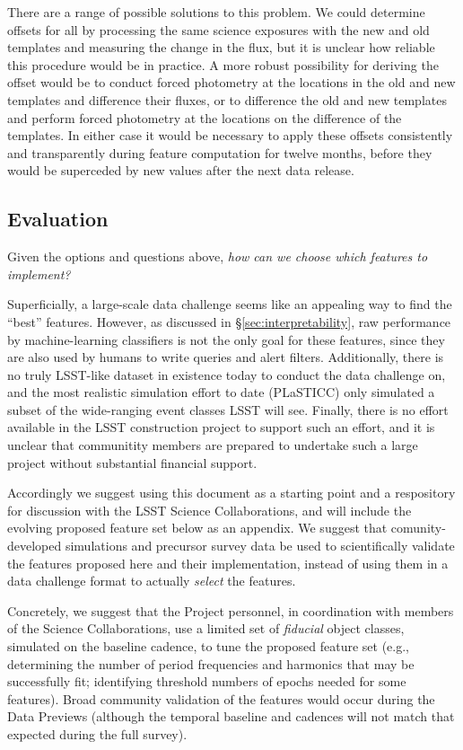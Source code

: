 \documentclass[DM,authoryear,toc]{lsstdoc}
\begin{document}
There are a range of possible solutions to this problem. 
We could determine offsets for all \DIAObjects by processing the same science exposures with the new and old templates and measuring the change in the \DIASource flux, but it is unclear how reliable this procedure would be in practice.
A more robust possibility for deriving the offset would be to conduct forced photometry at the \DIAObject locations in the old and new templates and difference their fluxes, or to difference the old and new templates and perform forced photometry at the \DIAObject locations on the difference of the templates.
In either case it would be necessary to apply these offsets consistently and transparently during feature computation for twelve months, before they would be superceded by new values after the next data release.  


\subsection{Evaluation}

Given the options and questions above, 
\textit{how can we choose which features to implement?}

Superficially, a large-scale data challenge seems like an appealing way to find the ``best'' features.
However, as discussed in \S \ref{sec:interpretability}, raw performance by machine-learning classifiers is not the only goal for these features, since they are also used by humans to write queries and alert filters.
Additionally, there is no truly LSST-like dataset in existence today to conduct the data challenge on, and the most realistic simulation effort to date (PLaSTICC) only simulated a subset of the wide-ranging event classes LSST will see.
Finally, there is no effort available in the LSST construction project to support such an effort, and it is unclear that communitity members are prepared to undertake such a large project without substantial financial support.

Accordingly we suggest using this document as a starting point and a respository for discussion with the LSST Science Collaborations, and will include the evolving proposed feature set below as an appendix.
We suggest that comunity-developed simulations and precursor survey data be used to scientifically validate the features proposed here and their implementation, instead of using them in a data challenge format to actually \textit{select} the features. 

Concretely, we suggest that the Project personnel, in coordination with members of the Science Collaborations, use a limited set of \textit{fiducial} object classes, simulated on the baseline cadence, to tune the proposed feature set (e.g., determining the number of period frequencies and harmonics that may be successfully fit; identifying threshold numbers of epochs needed for some features).
Broad community validation of the features would occur during the Data Previews (although the temporal baseline and cadences will not match that expected during the full survey).
\end{document}
